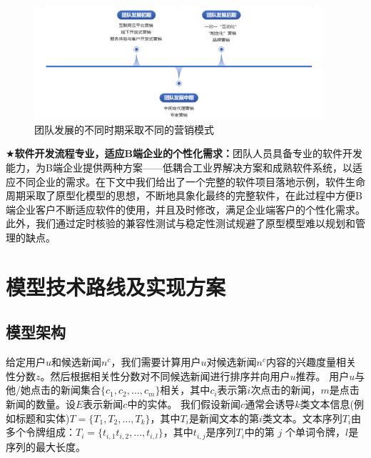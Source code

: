 \documentclass[withoutpreface,bwprint]{cumcmthesis} %
\begin{document}
	\begin{figure}[H]
		\includegraphics[width=0.95\textwidth]{营销发展}
		\caption{团队发展的不同时期采取不同的营销模式}
		\label{fig:circuit-diagcam}
	\end{figure}
	$\bigstar$\textbf{软件开发流程专业，适应B端企业的个性化需求：}团队人员具备专业的软件开发能力，为B端企业提供两种方案——低耦合工业界解决方案和成熟软件系统，以适应不同企业的需求。在下文中我们给出了一个完整的软件项目落地示例，软件生命周期采取了原型化模型的思想，不断地具象化最终的完整软件，在此过程中方便B端企业客户不断适应软件的使用，并且及时修改，满足企业端客户的个性化需求。此外，我们通过定时核验的兼容性测试与稳定性测试规避了原型模型难以规划和管理的缺点。\par
	\newpage
	\section{模型技术路线及实现方案}
	\subsection{模型架构}
	给定用户$u$和候选新闻$n^c$，我们需要计算用户$u$对候选新闻$n^c$内容的兴趣度量相关性分数$z$。然后根据相关性分数对不同候选新闻进行排序并向用户$u$推荐。
	用户$u$与他/她点击的新闻集合$\{ c_1, c_2, \dots, c_m\} $相关，其中$c_i$表示第$i$次点击的新闻，$m$是点击新闻的数量。设$E$表示新闻$c$中的实体。
	我们假设新闻$c$通常会诱导$k$类文本信息(例如标题和实体)$T = \{ T_1, T_2,\dots, T_k\} $，其中$T_i$是新闻文本的第$i$类文本。文本序列$T_i$由多个令牌组成：$T_i = \{ t_{ i,1}  t_{ i,2}  ,\dots, t_{ i,l} \} $，其中$t_{ i,j} $是序列$T_i$中的第{ $j$} 个单词令牌，$l$是序列的最大长度。
\end{document}

